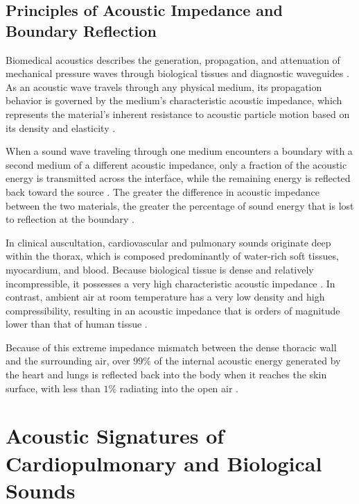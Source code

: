 \subsection{Principles of Acoustic Impedance and Boundary Reflection}

Biomedical acoustics describes the generation, propagation, and attenuation of mechanical pressure waves through biological tissues and diagnostic waveguides \cite{webster2010medical, pasterkamp1997respiratory}. As an acoustic wave travels through any physical medium, its propagation behavior is governed by the medium's characteristic acoustic impedance, which represents the material's inherent resistance to acoustic particle motion based on its density and elasticity \cite{kinsler2000fundamentals, webster2010medical}.

When a sound wave traveling through one medium encounters a boundary with a second medium of a different acoustic impedance, only a fraction of the acoustic energy is transmitted across the interface, while the remaining energy is reflected back toward the source \cite{kinsler2000fundamentals}. The greater the difference in acoustic impedance between the two materials, the greater the percentage of sound energy that is lost to reflection at the boundary \cite{webster2010medical}.

In clinical auscultation, cardiovascular and pulmonary sounds originate deep within the thorax, which is composed predominantly of water-rich soft tissues, myocardium, and blood. Because biological tissue is dense and relatively incompressible, it possesses a very high characteristic acoustic impedance \cite{webster2010medical, pasterkamp1997respiratory}. In contrast, ambient air at room temperature has a very low density and high compressibility, resulting in an acoustic impedance that is orders of magnitude lower than that of human tissue \cite{kinsler2000fundamentals, webster2010medical}. 

Because of this extreme impedance mismatch between the dense thoracic wall and the surrounding air, over $99\%$ of the internal acoustic energy generated by the heart and lungs is reflected back into the body when it reaches the skin surface, with less than $1\%$ radiating into the open air \cite{webster2010medical, pasterkamp1997respiratory}.


\section{Acoustic Signatures of Cardiopulmonary and Biological Sounds}

